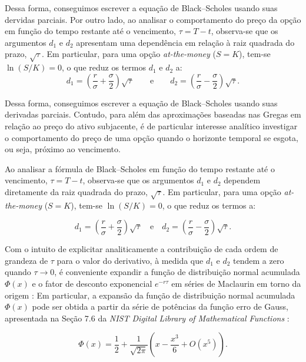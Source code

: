 Dessa forma, conseguimos escrever a equação de Black--Scholes usando suas dervidas parciais. Por outro lado, ao analisar o comportamento do preço da opção em função do tempo restante até o vencimento, $\tau = T - t$, observa-se que os argumentos $d_1$ e $d_2$ apresentam uma dependência em relação à raiz quadrada do prazo, $\sqrt{\tau}$. Em particular, para uma opção \textit{at-the-money} ($S = K$), tem-se $\ln(S/K) = 0$, o que reduz os termos $d_1$ e $d_2$ a:
\begin{equation}
d_1 = \left(\frac{r}{\sigma} + \frac{\sigma}{2}\right)\sqrt{\tau}
\qquad \text{e} \qquad
d_2 = \left(\frac{r}{\sigma} - \frac{\sigma}{2}\right)\sqrt{\tau}.
\end{equation}


Dessa forma, conseguimos escrever a equação de Black--Scholes usando suas derivadas parciais. Contudo, para além das aproximações baseadas nas Gregas em relação ao preço do ativo subjacente, é de particular interesse analítico investigar o comportamento do preço de uma opção quando o horizonte temporal se esgota, ou seja, próximo ao vencimento.

Ao analisar a fórmula de Black--Scholes em função do tempo restante até o vencimento, $\tau = T - t$, observa-se que os argumentos $d_1$ e $d_2$ dependem diretamente da raiz quadrada do prazo, $\sqrt{\tau}$. Em particular, para uma opção \textit{at-the-money} ($S = K$), tem-se $\ln(S/K) = 0$, o que reduz os termos a:

\begin{equation}
d_1 = \left(\frac{r}{\sigma} + \frac{\sigma}{2}\right)\sqrt{\tau}
\quad \text{e} \quad
d_2 = \left(\frac{r}{\sigma} - \frac{\sigma}{2}\right)\sqrt{\tau}.
\end{equation}

Com o intuito de explicitar analiticamente a contribuição de cada ordem de grandeza de $\tau$ para o valor do derivativo, à medida que $d_1$ e $d_2$ tendem a zero quando $\tau \to 0$, é conveniente expandir a função de distribuição normal acumulada $\Phi(x)$ e o fator de desconto exponencial $e^{-r\tau}$ em séries de Maclaurin em torno da origem \cite{strang2016}:
Em particular, a expansão da função de distribuição
normal acumulada $\Phi(x)$ pode ser obtida a partir
da série de potências da função erro de Gauss,
apresentada na Seção 7.6 da \textit{NIST Digital Library
of Mathematical Functions} \cite{nistDLMF}:

\begin{equation}
    \Phi(x)
    = \frac{1}{2}
    + \frac{1}{\sqrt{2\pi}}
    \left(
        x - \frac{x^3}{6} + O(x^5)
    \right).
\end{equation}

